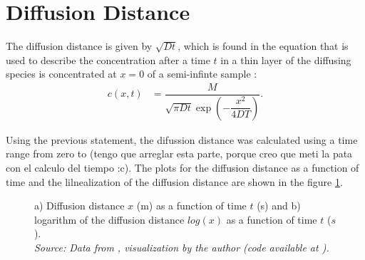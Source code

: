 \clearpage
\section{Diffusion Distance}

The diffusion distance is given by $\sqrt{Dt}$, which is found in the equation that is used to describe the concentration after a time $t$ in a thin layer of the diffusing species is concentrated at $x=0$ of a semi-infinte sample \cite{diff}:
\begin{align}
  \label{eq:3}
  c(x,t)&=\dfrac{M}{\sqrt{\pi D t} \exp\left(-\dfrac{x^2}{4DT}\right)}.
\end{align}

Using the previous statement, the difussion distance was calculated using a time range from zero to (tengo que arreglar esta parte, porque creo que meti la pata con el calculo del tiempo :c). The plots for the diffusion distance as a function of time and the lilnealization of the diffusion distance are shown in the figure \ref{fig:length}.

\begin{figure}[h]
 \centering
 \captionsetup{justification=centering}
 \caption{a) Diffusion distance $x$ (m) as a function of time $t$ (s) and b) logarithm of the diffusion distance $log(x)$ as a function of time $t$ ($s$). \\
 \textit{Source: Data from \citep{kakusan}, visualization by the author (code available at \citep{mygit}).}}
 \label{fig:length}
\end{figure}



